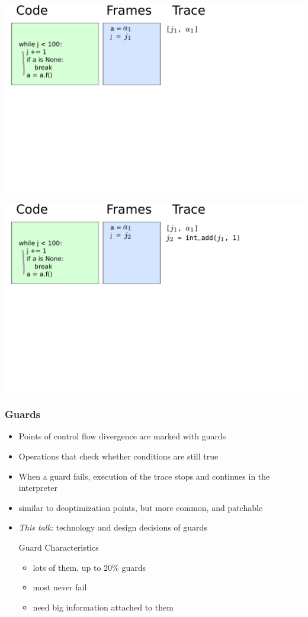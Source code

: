\documentclass[utf8x]{beamer}
\begin{document}
\begin{frame}
  \includegraphics[scale=0.4]{figures/loop01}
\end{frame}

\begin{frame}
  \includegraphics[scale=0.4]{figures/loop02}
\end{frame}

\begin{frame}
  \frametitle{Guards}
  \begin{itemize}
      \item Points of control flow divergence are marked with guards
      \item Operations that check whether conditions are still true
      \item When a guard fails, execution of the trace stops and continues in the interpreter
      \pause
      \item similar to deoptimization points, but more common, and patchable
      \item \emph{This talk:} technology and design decisions of guards
      \pause
      \begin{block}{Guard Characteristics}
          \begin{itemize}
              \item lots of them, up to 20\% guards
              \item most never fail
              \item need big information attached to them
          \end{itemize}
      \end{block}
  \end{itemize}
\end{frame}
\end{document}
